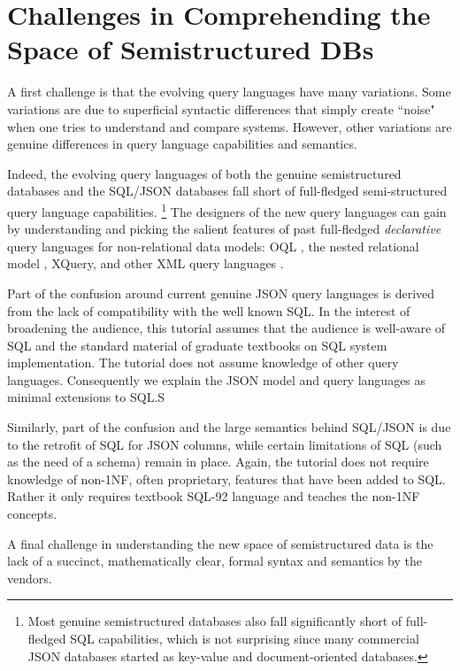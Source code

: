 
\section{Challenges in Comprehending the Space of Semistructured DBs}
A first challenge is that the evolving query languages have many variations. Some variations are due to superficial syntactic differences that simply create ``noise" when one tries to understand and compare systems. However, other variations are genuine differences in query language capabilities and semantics.

Indeed, the evolving query languages of both the genuine semistructured databases and the SQL/JSON databases fall short of full-fledged semi-structured query language capabilities.%
\footnote{Most genuine semistructured databases also fall significantly short of full-fledged SQL capabilities, which is not surprising since many commercial JSON databases started as key-value and document-oriented databases.}
The designers of the new query languages can gain by understanding and picking the salient features of past full-fledged \textit{declarative} query languages for non-relational data models: OQL \cite{oql-dbpl-1989}, the nested relational model \cite{nest-unnest-pods-1982,nested-relational-vldb-1988,nested-relational-workshop-lncs-1989}, 
XQuery, and other XML query languages \cite{xquery-3.0-w3c-2013,xml-ql-computer-networks-1999,xml-query-language-survey-sigmod-record-2000}.

Part of the confusion around current genuine JSON query languages is derived from the lack of compatibility with the well known SQL. In the interest of broadening the audience, this tutorial assumes that the audience is well-aware of SQL and the standard material of graduate textbooks on SQL system implementation. The tutorial does not assume knowledge of other query languages. Consequently we explain the JSON model and query languages as minimal extensions to SQL.S

Similarly, part of the confusion and the large semantics behind SQL/JSON is due to the retrofit of SQL for JSON columns, while certain limitations of SQL (such as the need of a schema) remain in place. Again, the tutorial does not require knowledge of non-1NF, often proprietary, features that have been added to SQL. Rather it only requires textbook SQL-92 language and teaches the non-1NF concepts.

A final challenge in understanding the new space of semistructured data is the lack of a succinct, mathematically clear, formal syntax and semantics by the vendors. 

